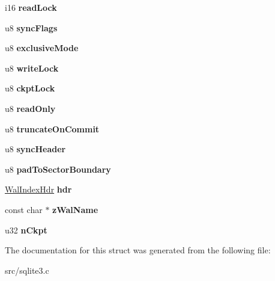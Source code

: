 \begin{DoxyCompactItemize}
\item 
\hypertarget{struct_wal_a260550c859ac7224fbdad0586dca664a}{i16 {\bfseries read\-Lock}}\label{struct_wal_a260550c859ac7224fbdad0586dca664a}

\item 
\hypertarget{struct_wal_ac1382875f5fe049ccf09f1c2d370c429}{u8 {\bfseries sync\-Flags}}\label{struct_wal_ac1382875f5fe049ccf09f1c2d370c429}

\item 
\hypertarget{struct_wal_ada255c96ca65d9d8955bbf139af4e6f4}{u8 {\bfseries exclusive\-Mode}}\label{struct_wal_ada255c96ca65d9d8955bbf139af4e6f4}

\item 
\hypertarget{struct_wal_ad7f4ba84f07115b7ce3a6133479c9d24}{u8 {\bfseries write\-Lock}}\label{struct_wal_ad7f4ba84f07115b7ce3a6133479c9d24}

\item 
\hypertarget{struct_wal_a29153bfb37a9a32f1171e5c1d10994d2}{u8 {\bfseries ckpt\-Lock}}\label{struct_wal_a29153bfb37a9a32f1171e5c1d10994d2}

\item 
\hypertarget{struct_wal_a38f0810e34bdc89acdf27574473c0495}{u8 {\bfseries read\-Only}}\label{struct_wal_a38f0810e34bdc89acdf27574473c0495}

\item 
\hypertarget{struct_wal_a12870bbe7755271c94c3eb1fd0280c56}{u8 {\bfseries truncate\-On\-Commit}}\label{struct_wal_a12870bbe7755271c94c3eb1fd0280c56}

\item 
\hypertarget{struct_wal_ae3de9666170c103a835a2c767932d3f9}{u8 {\bfseries sync\-Header}}\label{struct_wal_ae3de9666170c103a835a2c767932d3f9}

\item 
\hypertarget{struct_wal_af10e79ca8fe617d7df706182ebdf7039}{u8 {\bfseries pad\-To\-Sector\-Boundary}}\label{struct_wal_af10e79ca8fe617d7df706182ebdf7039}

\item 
\hypertarget{struct_wal_adbeef9e632541fbf07c926652b165906}{\hyperlink{struct_wal_index_hdr}{Wal\-Index\-Hdr} {\bfseries hdr}}\label{struct_wal_adbeef9e632541fbf07c926652b165906}

\item 
\hypertarget{struct_wal_ac54961758701702d67eaf3ce15c69ea5}{const char $\ast$ {\bfseries z\-Wal\-Name}}\label{struct_wal_ac54961758701702d67eaf3ce15c69ea5}

\item 
\hypertarget{struct_wal_a8fbe9b014342db76d8167b518b70acad}{u32 {\bfseries n\-Ckpt}}\label{struct_wal_a8fbe9b014342db76d8167b518b70acad}

\end{DoxyCompactItemize}


The documentation for this struct was generated from the following file\-:\begin{DoxyCompactItemize}
\item 
src/sqlite3.\-c\end{DoxyCompactItemize}
